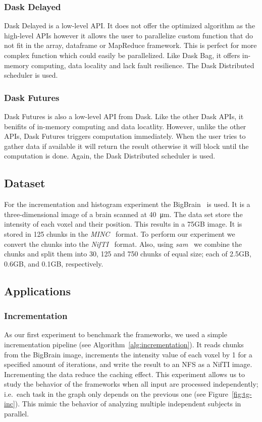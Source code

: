 \documentclass[conference]{IEEEtran}
\begin{document}
\subsubsection{Dask Delayed~\cite{dask-delayed}} Dask Delayed is a low-level API. It
does not offer the optimized algorithm as the high-level APIs however it allows the
user to parallelize custom function that do not fit in the array, dataframe or
MapReduce framework. This is perfect for more complex function which could easily be
parallelized. Like Dask Bag, it offers in-memory computing, data locality and lack
fault resilience. The Dask Distributed scheduler is used.

\subsubsection{Dask Futures~\cite{dask-futures}} Dask Futures is also a low-level API
from Dask. Like the other Dask APIs, it benifits of in-memory computing and data
locatlity. However, unlike the other APIs, Dask Futures triggers computation
immediately. When the user tries to gather data if available it will return the
result otherwise it will block until the computation is done. Again, the Dask
Distributed scheduler is used.


\subsection{Dataset}
For the incrementation and histogram experiment the BigBrain~\cite{Amunts:13} is
used. It is a three-dimensional image of a brain scanned at \SI{40}{\micro\metre}.
The data set store the intensity of each voxel and their position. This results in a
75GB image. It is stored in 125 chunks in the \textit{MINC}~\cite{minc} format. To
perform our experiment we convert the chunks into the \textit{NifTI}~\cite{nifti}
format. Also, using \textit{sam}~\cite{sam} we combine the chunks and split them into
30, 125 and 750 chunks of equal size; each of 2.5GB, 0.6GB, and 0.1GB, respectively.

\subsection{Applications}
\subsubsection{\textbf{Incrementation}}
As our first experiment to benchmark the frameworks, we used a simple incrementation
pipeline (see Algorithm~\ref{alg:incrementation}). It reads chunks from the BigBrain
image, increments the intensity value of each voxel by 1 for a specified amount of
iterations, and write the result to an NFS as a NifTI image. Incrementing the data
reduce the caching effect. This experiment allows us to study the behavior of the
frameworks when all input are processed independently; i.e.\ each task in the graph
only depends on the previous one (see Figure~\ref{fig:tg-inc}). This mimic the
behavior of analyzing multiple independent subjects in parallel.
\end{document}

